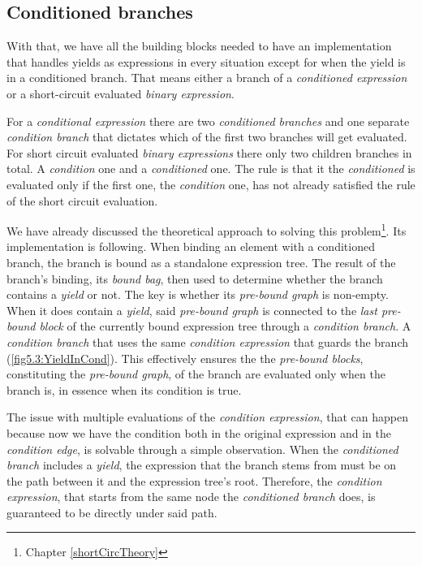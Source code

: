 \subsection{Conditioned branches}

With that, we have all the building blocks needed to have an implementation that handles yields as expressions in every situation except for when the yield is in a conditioned branch. That means either a branch of a \emph{conditioned expression} or a short-circuit evaluated \emph{binary expression}.

For a \emph{conditional expression} there are two \emph{conditioned branches} and one separate \emph{condition branch} that dictates which of the first two branches will get evaluated. For short circuit evaluated \emph{binary expressions} there only two children branches in total. A \emph{condition} one and a \emph{conditioned} one. The rule is that it the \emph{conditioned} is evaluated only if the first one, the \emph{condition} one, has not already satisfied the rule of the short circuit evaluation.  

We have already discussed the theoretical approach to solving this problem\footnote{Chapter \ref{shortCircTheory}}. Its implementation is following. When binding an element with a conditioned branch, the branch is bound as a standalone expression tree. The result of the branch’s binding, its \emph{bound bag}, then used to determine whether the branch contains a \emph{yield} or not. The key is whether its \emph{pre-bound graph} is non-empty. When it does contain a \emph{yield}, said \emph{pre-bound graph} is connected to the \emph{last pre-bound block} of the currently bound expression tree through a \emph{condition branch}. A \emph{condition branch} that uses the same \emph{condition expression} that guards the branch (\autoref{fig5.3:YieldInCond}). This effectively ensures the the \emph{pre-bound blocks}, constituting the \emph{pre-bound graph}, of the branch are evaluated only when the branch is, in essence when its condition is true.
 
The issue with multiple evaluations of the \emph{condition expression}, that can happen because now we have the condition both in the original expression and in the \emph{condition edge}, is solvable through a simple observation. When the \emph{conditioned branch} includes a \emph{yield}, the expression that the branch stems from must be on the path between it and the expression tree’s root. Therefore, the \emph{condition expression}, that starts from the same node the \emph{conditioned branch} does, is guaranteed to be directly under said path. 

